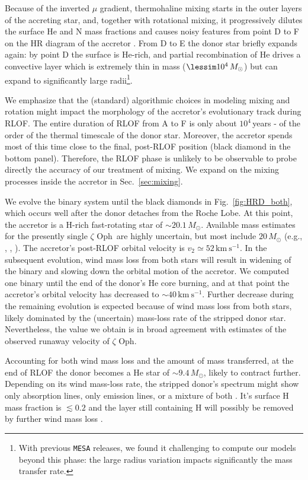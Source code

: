 \documentclass[twocolumn,twocolappendix,trackchanges]{aastex63}
\newcommand{\kms}{{\mathrm{km\ s^{-1}}}}
\DeclareRobustCommand{\Figref}[1]{Fig.~\ref{#1}}
\DeclareRobustCommand{\Secref}[1]{Sec.~\ref{#1}}
\newcommand{\zoph}{$\zeta$ Oph}
\begin{document}
Because of the inverted $\mu$ gradient, thermohaline mixing starts in
the outer layers of the accreting star, and, together with rotational
mixing, it progressively dilutes the surface He and N mass fractions
and causes noisy features from point D to F on the HR diagram of the accretor
\citep[e.g.,][]{cantiello:07}. From D to E the donor star briefly expands
again: by point D the surface is He-rich, and partial recombination of
He drives a convective layer which is extremely thin in mass
($\lessim 10^4\,M_\odot$) but can expand to significantly large
radii\footnote{With previous \texttt{MESA} releases, we found it
  challenging to compute our models beyond this phase: the large radius variation
  impacts significantly the mass transfer rate.}.

We emphasize that the (standard) algorithmic choices in
modeling mixing and rotation might impact the morphology of the
accretor's evolutionary track during RLOF. The entire duration of RLOF
from A to F is only about $10^4$\,years - of the order of the thermal timescale of
the donor star. Moreover, the accretor spends most of this time close
to the final, post-RLOF position (black diamond in the bottom
panel). Therefore, the RLOF phase is unlikely to be observable to
probe directly the accuracy of our treatment of mixing. We expand on
the mixing processes inside the accretor in \Secref{sec:mixing}.

We evolve the binary system until the black diamonds in
\Figref{fig:HRD_both}, which occurs well after the donor detaches from
the Roche Lobe. At this point, the accretor is a H-rich fast-rotating
star of
$\sim$$20.1\,M_\odot$. Available mass estimates for the presently single \zoph\ are highly uncertain, but most include
$20\,M_\odot$ (e.g., \citealt{hoogerwerf:01}, , \citealt{neuhauser:20}). The accretor's post-RLOF orbital velocity is
$v_2\simeq52\,\kms$. In the subsequent evolution, wind mass loss from both stars will result in widening of the binary and slowing down the orbital motion of the accretor. We computed one binary until the end of the donor's He core burning, and at that point the accretor's orbital velocity has decreased to
$\sim$$40\,\kms$. Further decrease during the remaining evolution
is expected because of wind mass loss from both stars, likely dominated by the
(uncertain) mass-loss rate of the stripped donor star. Nevertheless,
the value we obtain is in broad agreement with estimates of the
observed runaway velocity of \zoph.

Accounting for both wind mass loss and the amount of mass transferred,
at the end of RLOF the donor becomes a He star of
$\sim$$9.4\,M_\odot$, likely to contract further. Depending on its wind mass-loss rate, the stripped donor's spectrum might show only absorption lines, only emission lines, or a mixture of both \citep[e.g.,][]{crowther:07, neugent:17, gotberg:18}. It's surface H mass fraction is $\lesssim
0.2$ and the layer still containing H will possibly be removed by further wind mass loss \citep[e.g.,][]{gotberg:17}.
\end{document}
